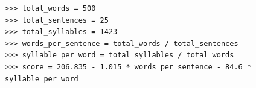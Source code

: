 \documentclass{beamer}
\begin{document}
\begin{frame}[fragile]
\begin{lstlisting}
>>> total_words = 500
>>> total_sentences = 25
>>> total_syllables = 1423
>>> words_per_sentence = total_words / total_sentences
>>> syllable_per_word = total_syllables / total_words
>>> score = 206.835 - 1.015 * words_per_sentence - 84.6 * syllable_per_word
\end{lstlisting}
\end{frame}
\end{document}
